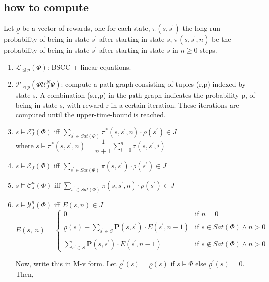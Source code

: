 \documentclass[a4paper,12pt]{article}
\begin{document}
\subsection{how to compute}
Let $\underline{\rho}$ be a vector of rewards, one for each state, $\pi(s,s^{\prime})$ the long-run probability of being in state $s^{\prime}$ after starting in state $s$, $\pi(s,s^{\prime}, n)$ be the probability of being in state $s^{\prime}$ after starting in state $s$ in $n \geq 0$ steps.
\begin{enumerate}
\item $\mathcal{L}_{\trianglelefteq p}(\Phi)$: BSCC + linear equations.
\item $\mathcal{P}_{\trianglelefteq p}(\Phi \mathcal{U}_{J}^{N}\Psi)$: compute a path-graph consisting of tuples (r,p) indexed by state s. A combination (s,r,p) in the path-graph indicates the probability p, of being in state s, with reward r in a certain iteration. These iterations are computed until the upper-time-bound is reached.
\item $s \vDash \mathcal{E}^{n}_{J}(\Phi)$ iff $\sum\limits_{s^{\prime} \in Sat(\Phi)} \pi^{*}(s, s^{\prime}, n)\cdot\underline{\rho}(s^{\prime})\in J$ \\
where $s \vDash \pi^{*}(s, s^{\prime}, n) = \dfrac{1}{n+1}\sum\limits_{i=0}^{n}\pi(s, s^{\prime}, i)$
\item $s \vDash \mathcal{E}_{J}(\Phi)$ iff $\sum\limits_{s^{\prime} \in Sat(\Phi)} \pi(s, s^{\prime})\cdot\underline{\rho}(s^{\prime})\in J$
\item $s \vDash \mathcal{C}^{n}_{J}(\Phi)$ iff $\sum\limits_{s^{\prime} \in Sat(\Phi)} \pi(s, s^{\prime}, n)\cdot \underline{\rho}(s^{\prime}) \in J$
\item $s \vDash \mathcal{Y}^{n}_{J}(\Phi)$ iff $\underline{E}(s,n)\in J$
\begin{equation*}
E(s,\ n)=\left\{
\begin{array}{ll}
0 & \text{if }n=0 \\ \\
\underline{\rho}(s)+\sum\limits_{s^{\prime}\in S} \boldsymbol{P}(s,s^{\prime})\cdot E(s^{\prime},n-1) & \text{if } s\in Sat(\Phi) \wedge n>0 \\ \\
\sum\limits_{s^{\prime}\in S} \boldsymbol{P}(s,s^{\prime})\cdot E(s^{\prime},n-1) & \text{if } s\notin Sat(\Phi) \wedge n>0
\end{array}
\right.
\end{equation*}

Now, write this in M-v form. Let $\underline{\rho}^{\prime}(s)=\underline{\rho}(s)$ if $s\vDash \Phi$ else $\underline{\rho}^{\prime}(s)=0$. Then,
\begin{center}\end{center}

\end{enumerate}
\end{document}
